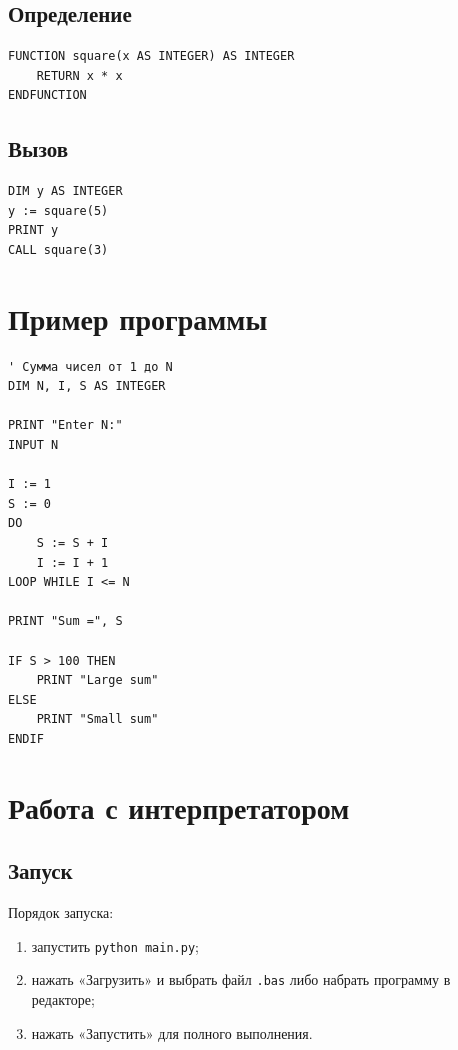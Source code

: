 \documentclass[14pt,a4paper]{article}
\begin{document}
\subsection{Определение}

\begin{lstlisting}[language={},numbers=none]
FUNCTION square(x AS INTEGER) AS INTEGER
    RETURN x * x
ENDFUNCTION
\end{lstlisting}

\subsection{Вызов}

\begin{lstlisting}[language={},numbers=none]
DIM y AS INTEGER
y := square(5)
PRINT y
CALL square(3)
\end{lstlisting}

\section{Пример программы}

\begin{lstlisting}[language={},numbers=none]
' Сумма чисел от 1 до N
DIM N, I, S AS INTEGER

PRINT "Enter N:"
INPUT N

I := 1
S := 0
DO
    S := S + I
    I := I + 1
LOOP WHILE I <= N

PRINT "Sum =", S

IF S > 100 THEN
    PRINT "Large sum"
ELSE
    PRINT "Small sum"
ENDIF
\end{lstlisting}

\section{Работа с интерпретатором}

\subsection{Запуск}

Порядок запуска:
\begin{enumerate}
  \item запустить \texttt{python main.py};
  \item нажать «Загрузить» и выбрать файл \texttt{.bas} либо набрать
        программу в редакторе;
  \item нажать «Запустить» для полного выполнения.
\end{enumerate}
\end{document}

